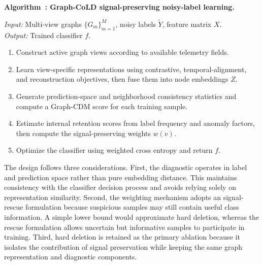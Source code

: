 \documentclass[pdflatex,referee,lineno,sn-basic,Numbered]{sn-jnl}
\newcounter{algorithm}
\renewcommand{\thealgorithm}{\arabic{algorithm}}
\begin{document}
\begin{center}
\label{alg:graphcold}
\begin{minipage}{0.92\linewidth}
\textbf{Algorithm~\thealgorithm: Graph-CoLD signal-preserving noisy-label learning.}

\textit{Input:} Multi-view graphs $\{G_m\}_{m=1}^{M}$, noisy labels
$\tilde{Y}$, feature matrix $X$. \\
\textit{Output:} Trained classifier $f$.

\begin{enumerate}
\item Construct active graph views according to available telemetry fields.
\item Learn view-specific representations using contrastive, temporal-alignment,
and reconstruction objectives, then fuse them into node embeddings $Z$.
\item Generate prediction-space and neighborhood consistency statistics and
compute a Graph-CDM score for each training sample.
\item Estimate internal retention scores from label frequency and anomaly
factors, then compute the signal-preserving weights $w(v)$.
\item Optimize the classifier using weighted cross entropy and return $f$.
\end{enumerate}
\end{minipage}
\end{center}

The design follows three considerations. First, the diagnostic operates in label
and prediction space rather than pure embedding distance. This maintains
consistency with the classifier decision process and avoids relying solely on
representation similarity. Second, the weighting mechanism adopts an
signal-rescue formulation because suspicious samples may still contain useful
class information. A simple lower bound would approximate hard deletion,
whereas the rescue formulation allows uncertain but informative samples to
participate in training. Third, hard deletion is retained as the primary
ablation because it isolates the contribution of signal preservation while
keeping the same graph representation and diagnostic components.
\end{document}
